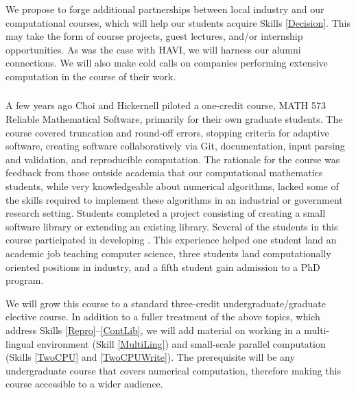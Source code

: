 \documentclass[11pt]{NSFamsart}
\begin{document}
We propose to forge additional partnerships between local industry and our computational courses, which will help our students acquire Skills \ref{Decision}.  This may take the form of course projects, guest lectures, and/or internship opportunities.  As was the case with HAVI, we will harness our alumni connections.  We will also make cold calls on companies performing extensive computation in the course of their work.

\subsubsection{\RelSoftName} \label{RelSoft} A few years ago Choi and Hickernell piloted a one-credit course, MATH 573 Reliable Mathematical Software, primarily for their own graduate students.  The course covered truncation and round-off errors,
stopping criteria for adaptive software,
creating software collaboratively via Git, 
documentation,
input parsing and validation, and
reproducible computation.
The rationale for the course was feedback from those outside academia that our computational mathematics students, while very knowledgeable about numerical algorithms, lacked some of the skills required to implement these algorithms in an industrial or government research setting.
Students completed a project consisting of creating a small software library or extending an existing library.  Several of the students in this course participated in developing \GAIL \cite{ChoEtal17b}.  This experience helped one student land an academic job teaching computer science, three students land computationally oriented positions in industry, and a fifth student gain admission to a PhD program.

We will grow this course to a standard three-credit undergraduate/graduate elective course.  In addition to a fuller treatment of the above topics, which address Skills \ref{Repro}--\ref{ContLib}, we will add material on working in a multi-lingual environment (Skill \ref{MultiLing}) and small-scale parallel computation (Skills \ref{TwoCPU} and \ref{TwoCPUWrite}).  The prerequisite will be any undergraduate course that covers numerical computation, therefore making this course accessible to a wider audience.
\end{document}
